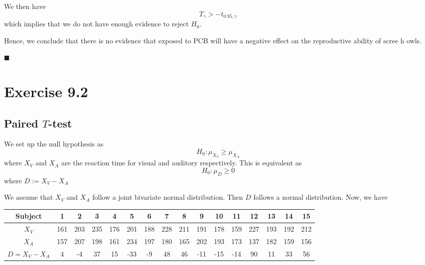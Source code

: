 \documentclass[13pt]{article}
\newcommand{\myqed}{\hfill$\blacksquare$}
\begin{document}
\par We then have 
\begin{equation*}
    T_\gamma > -t_{0.95, \gamma}
\end{equation*}
which implies that we do not have enough evidence to reject $H_0$. 

\par Hence, we conclude that there is no evidence that exposed to PCB will have a negative effect on the reproductive 
ability of scree h owls.

\myqed

\newpage
\section*{Exercise 9.2}
\subsection*{Paired $T$-test}
\par We set up the null hypothesis as 
\begin{equation*}
    H_0 : \mu_{X_V} \geq \mu_{X_A}
\end{equation*}
where $X_V$ and $X_A$ are the reaction time for visual and auditory respectively. This is equivalent as 
\begin{equation*}
    H_0 : \mu_D \geq 0
\end{equation*}
where $D := X_V - X_A$

\par We assume that $X_V$ and $X_A$ follow a joint bivariate normal distribution. Then $D$ follows a normal distribution.
Now, we have 
\begin{table}[H]
    \centering
    \begin{tabular}{c | ccccccccccccccc}
        Subject & 1 & 2 & 3 & 4 & 5 & 6 & 7 & 8 & 9 & 10 & 11 & 12 & 13 & 14 & 15\\
        \toprule
        $X_V$           & 161   & 203   & 235   & 176   & 201   & 188   & 228   & 211   & 191   & 178   & 159   & 227   & 193   & 192   & 212   \\
        $X_A$           & 157   & 207   & 198   & 161   & 234   & 197   & 180   & 165   & 202   & 193   & 173   & 137   & 182   & 159   & 156   \\
        $D = X_V - X_A$ & 4     & -4    & 37    & 15    & -33   & -9    & 48    & 46    & -11   & -15   & -14   & 90    & 11    & 33    & 56    \\
    \end{tabular}
\end{table}
\end{document}
